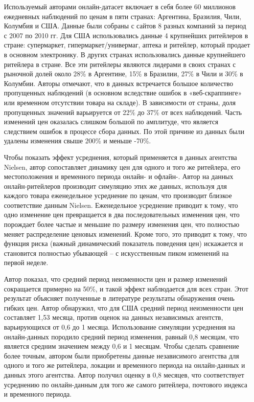 Используемый авторами онлайн-датасет включает в себя более 60 миллионов ежедневных наблюдений по ценам в пяти странах: Аргентина, Бразилия, Чили, Колумбия и США. Данные были собраны с сайтов 8 разных компаний за период с 2007 по 2010 гг. Для США использовались данные 4 крупнейших ритейлеров в стране: супермаркет, гипермаркет/универмаг, аптека и ритейлер, который продает в основном электронику. В других странах использовались данные крупнейшего ритейлера в стране. Все эти ритейлеры являются лидерами в своих странах с рыночной долей около 28\% в Аргентине, 15\% в Бразилии, 27\% в Чили и 30\% в Колумбии. Авторы отмечают, что в данных встречается большое количество пропущенных наблюдений (в основном вследствие ошибок в «веб-скраппинге» или временном отсутствии товара на складе). В зависимости от страны, доля пропущенных значений варьируется от 22\% до 37\% от всех наблюдений. Часть изменений цен оказалась слишком большой по амплитуде, что является следствием ошибок в процессе сбора данных. По этой причине из данных были удалены изменения свыше 200\% и меньше -70\%.

Чтобы показать эффект усреднения, который применяется в данных агентства Nielsen, автор сопоставляет динамику цен для одного и того же ритейлера, его местоположения и временного периода онлайн- и офлайн-. Автор на данных онлайн-ритейлеров производит симуляцию этих же данных, используя для каждого товара еженедельное усреднение по ценам, что производит близкое соответствие данным Nielsen. Еженедельное усреднение приводит к тому, что одно изменение цен превращается в два последовательных изменения цен, что порождает более частые и меньшие по размеру изменения цен, что полностью меняет распределение ценовых изменений. Кроме того, это приводит к тому, что функция риска (важный динамический показатель поведения цен) искажается и становится полностью убывающей – с искусственным пиком изменений на первой неделе.

Автор показал, что средний период неизменности цен и размер изменений сокращается примерно на 50\%, и такой эффект наблюдается для всех стран. Этот результат объясняет полученные в литературе результаты обнаружения очень гибких цен. Автор обнаружил, что для США средний период неизменности цен составляет 1,53 месяца, против оценок на данных независимых агентств, варьирующихся от 0,6 до 1 месяца. Использование симуляции усреднения на онлайн-данных породило средний период изменения, равный 0,8 месяцам, что является средним значением между 0,6 и 1 месяцам. Чтобы сделать сравнение более точным, автором были приобретены данные независимого агентства для одного и того же ритейлера, локации и временного периода на онлайн-данных и данных этого агентства. Автор получил оценку в 0,8 месяцев, что соответствует усреднению по онлайн-данным для того же самого ритейлера, почтового индекса и временного периода.

